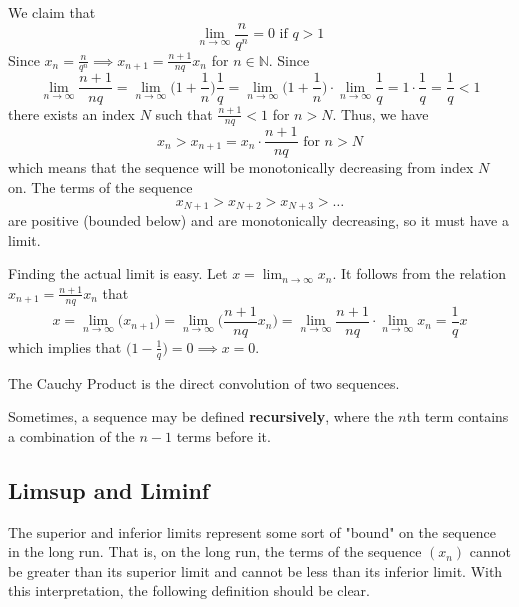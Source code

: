   \begin{example}
    We claim that 
    \[\lim_{n\rightarrow \infty} \frac{n}{q^n} = 0 \text{ if } q>1\]
    Since $x_n = \frac{n}{q^n} \implies x_{n+1} = \frac{n+1}{nq} x_n$ for $n \in \mathbb{N}$. Since 
    \[\lim_{n\rightarrow \infty} \frac{n+1}{nq} = \lim_{n \rightarrow \infty} \bigg(1 + \frac{1}{n}\bigg) \frac{1}{q} = \lim_{n\rightarrow \infty} \bigg( 1 + \frac{1}{n} \bigg) \cdot \lim_{n\rightarrow \infty} \frac{1}{q} = 1 \cdot \frac{1}{q} = \frac{1}{q} < 1\]
    there exists an index $N$ such that $\frac{n+1}{nq} < 1$ for $n>N$. Thus, we have 
    \[x_n > x_{n+1} = x_n \cdot \frac{n+1}{nq} \text{ for } n > N\]
    which means that the sequence will be monotonically decreasing from index $N$ on. The terms of the sequence
    \[x_{N+1} > x_{N+2} > x_{N+3} > \ldots\]
    are positive (bounded below) and are monotonically decreasing, so it must have a limit. 

    Finding the actual limit is easy. Let $x = \lim_{n \rightarrow \infty} x_n$. It follows from the relation $x_{n+1} = \frac{n+1}{nq} x_n$ that
    \[x = \lim_{n\rightarrow \infty} \big(x_{n+1}\big) = \lim_{n \rightarrow \infty} \bigg(\frac{n+1}{nq} x_n \bigg) = \lim_{n \rightarrow \infty} \frac{n+1}{nq} \cdot \lim_{n \rightarrow \infty} x_n = \frac{1}{q} x\]
    which implies that $\big( 1 - \frac{1}{q}\big) = 0 \implies x = 0$.
  \end{example}

  \begin{definition}
    The Cauchy Product is the direct convolution of two sequences. 
  \end{definition} 

  \begin{definition}
    Sometimes, a sequence may be defined \textbf{recursively}, where the $n$th term contains a combination of the $n-1$ terms before it.  
  \end{definition}

\subsection{Limsup and Liminf} 

  The superior and inferior limits represent some sort of "bound" on the sequence in the long run. That is, on the long run, the terms of the sequence $(x_n)$ cannot be greater than its superior limit and cannot be less than its inferior limit. With this interpretation, the following definition should be clear. 

